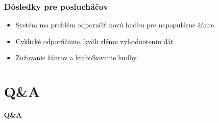 \documentclass{beamer}
\begin{document}
\begin{frame}\frametitle{Dôsledky pre poslucháčov}
\begin{itemize}
	\item Systém ma problém odporučiť novú hudbu pre nepopulárne žánre.
	\item Cyklické odporúčanie, kvôli zlému vyhodnoteniu dát
	\item Zužovanie žánrov a krabičkovanie hudby
\end{itemize}
\end{frame}

\section{Q\&A}
\begin{frame}
	\HUGE\textbf{Q\&A}
\end{frame}
\end{document}
